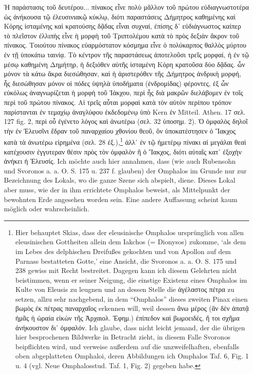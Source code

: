 \documentclass[a4paper, 11pt, oneside]{article}
\begin{document}
Ἡ παράστασις τοῦ δευτέρου... πίνακος εἶνε πολὺ μᾶλλον τοῦ πρώτου εὐδιαγνωστοτέρα ὡς ἀνήκουσα τῷ ἐλευσινιακῷ κύκλῳ, διότι παραστάσεις Δήμητρος καθημένης καὶ Κόρης ἱσταμένης καὶ κρατούσης δᾷδας εἶναι συχναί, ἐπίσης δ᾽ εὐδιάγνωστος καίπερ τὸ πλεῖστον ἐλλιπὴς εἶνε ἡ μορφὴ τοῦ Τριπτολέμου κατὰ τὸ πρὸς δεξιὰν ἄκρον τοῦ πίνακος. Τοιούτου πίνακος εὐαρμόστατον κόσμημα εἶνε ὁ πολύκαρπος θαλλὸς μύρτου ἐν τῇ ὑποκάτω ταινίᾳ. Τὸ κέντρον τῆς παραστάσεως ἀποτελοῦσι τρεῖς μορφαί, ἡ ἐν τῷ μέσῳ καθημένη Δημήτηρ, ἡ δεξιόθεν αὐτῆς ἱσταμένη Κόρη κρατοῦσα δύο δᾷδας. ὧν μόνον τὰ κάτω ἄκρα διεσώθησαν, καὶ ἡ ἀριστερόθεν τῆς Δήμητρος ἀνδρικὴ μορφή, ἧς διεσώθησαν μόνον οἱ πόδες ὑψηλὰ ὑποδήματα (ἐνδρομίδας) φέροντες, ἐξ ὧν εὐκόλως ἀναγνωρίζεται ἡ μορφὴ τοῦ Ἰάκχου, περὶ ἧς διὰ μακρῶν διελάβομεν ἐν τοῖς περὶ τοῦ πρώτου πίνακος. Αἱ τρεῖς αὖται μορφαὶ κατὰ τὸν αὐτὸν περίπου τρόπον παρίστανται ἐν τεμαχίῳ ἀναγλύφου ἐκδεδομένῳ ὑπὸ Kern ἐν Mitteil. Athen. 17 σελ. 127 fig. 2,  περὶ οὗ ἐγένετο λόγος καὶ ἀνωτέρω (σελ. 32 ὑποσημ. 2). Ὁ ὀμφαλὸς δηλοῖ τὴν ἐν Ἐλευσῖνι ἔδραν τοῦ παναρχαίου χθονίου θεοῦ, ὃν ὑποκατέστησεν ὁ Ἴακχος κατὰ τὰ ἀνωτέρω εἰρημένα (σελ. 28 ἐξ.),\footnote{Hier behauptet Skias, dass der eleusinische Omphalos ursprünglich von allen eleusinischen Gottheiten allein dem Iakchos (= Dionysos) zukomme, `als dem im Lebes des delphischen Dreifußes gekochten und von Apollon auf dem Parnass bestatteten Gotte,' eine Ansicht, die Svoronos a. a. O. S. 175 und 238 gewiss mit Recht bestreitet. Dagegen kann ich diesem Gelehrten nicht beistimmen, wenn er seiner Neigung, die einstige Existenz eines Omphalos im Kulte von Eleusis zu leugnen und an dessen Stelle die ἀγέλαστος πέτρα zu setzen, allzu sehr nachgebend, in dem "`Omphalos"' dieses zweiten Pinax einen βωμὸς ἐκ πέτρας παναρχαῖος erkennen will, weil dessen ἄνω μέρος (ἃν δὲν ἀπατᾷ ἡμᾶς ἡ ὡραία εἰκὼν τῆς Ἀρχαιολ. Ἐφημ.) ἐπίπεδον καὶ βωμοειδές, ἤ τοι σχῆμα ἀνήκουστον δι᾽ ὀμφαλόν. Ich glaube, dass nicht leicht jemand, der die übrigen hier besprochenen Bildwerke in Betracht zieht, in diesem Falle Svoronos beipflichten wird, und verweise außerdem auf die unzweifelhaften, ebenfalls oben abgeplatteten Omphaloi, deren Abbildungen ich Omphalos Taf. 6, Fig. 1 u. 4 (vgl. Neue Omphalosstud. Taf. 1, Fig. 2) gegeben habe.} ἀλλ᾽ ἐν τῷ ἡμετέρῳ πίνακι αἱ μεγάλαι θεαὶ κατέχουσιν ἐγγυτεραν θέσιν πρὸς τὸν ὀμφαλὸν ἢ ὁ Ἴακχος, διότι αὐταῖς κατ᾽ ἐξοχὴν ἀνήκει ἡ Ἐλευσίς. Ich möchte auch hier annahmen, dass (wie auch Rubensohn und Svoronos a. a. O. S. 175 u. 237 f. glauben) der Omphalos im Grunde nur zur Bezeichnung des Lokals, wo die ganze Szene sich abspielt, diene. Dieses Lokal aber muss, wie der in ihm errichtete Omphalos beweist, als Mittelpunkt der bewohnten Erde angesehen worden sein. Eine andere Auffassung scheint kaum möglich oder wahrscheinlich.
\end{document}
